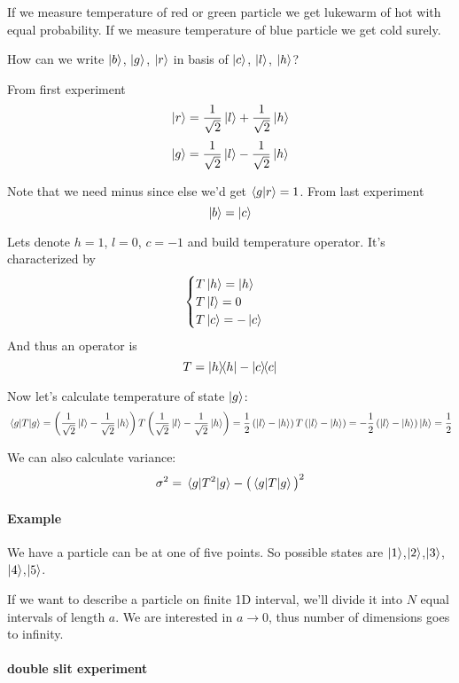 If we measure temperature of red or green particle we get lukewarm of hot with equal probability. If we measure temperature of blue particle we get cold surely.

How can we write $\ket{b}$, $\ket{g}$, $\ket{r}$ in basis of $\ket{c}$, $\ket{l}$, $\ket{h}$?

From first experiment
$$\ket{r} =  \frac{1}{\sqrt{2}} \ket{l} + \frac{1}{\sqrt{2}} \ket{h} $$
$$\ket{g} =   \frac{1}{\sqrt{2}} \ket{l} - \frac{1}{\sqrt{2}} \ket{h} $$

Note that we need minus since else we'd get $\braket{g}{r} = 1$.
From last experiment
$$\ket{b}= \ket{c}$$

Lets denote $h=1$, $l=0$, $c=-1$ and build temperature operator. It's characterized by
$$\begin{cases}
T\ket{h} = \ket{h}\\
T\ket{l} = 0\\
T\ket{c} = -\ket{c}
\end{cases}$$
And thus an operator is
$$T = \op{h}{h} - \op{c}{c}$$

Now let's calculate temperature of state $\ket{g}$:
$$\mel{g}{T}{g} = \left(\frac{1}{\sqrt{2}} \ket{l} - \frac{1}{\sqrt{2}} \ket{h}\right)T \left(\frac{1}{\sqrt{2}} \ket{l} - \frac{1}{\sqrt{2}} \ket{h} \right) = \frac{1}{2}  \left(\ket{l} -\ket{h}\right)T \left( \ket{l} -\ket{h} \right) =-\frac{1}{2}  \left(\ket{l} -\ket{h}\right)\ket{h} = \frac{1}{2}  $$

We can also calculate variance:
$$\sigma^2 = \mel{g}{T^2}{g} - \big(\mel{g}{T}{g}\big)^2$$

\paragraph{Example}
We have a particle can be at one of five points. So possible states are $\ket{1}$,$\ket{2}$,$\ket{3}$,$\ket{4}$,$\ket{5}$.

If we want to describe a particle on finite 1D interval, we'll divide it into $N$ equal intervals of length $a$. We are interested in $a \to 0$, thus number of dimensions goes to infinity.

\paragraph{double slit experiment}